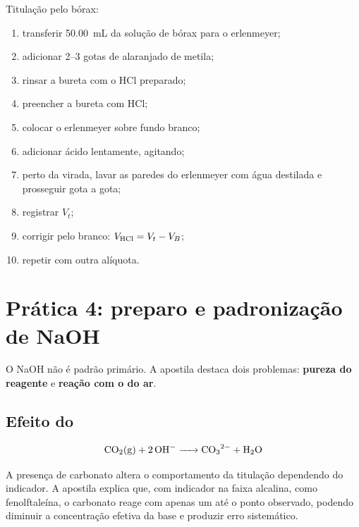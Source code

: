 \documentclass[a4paper,12pt]{article}
\begin{document}
\begin{procedimento}
Titulação pelo bórax:
\begin{enumerate}[leftmargin=1.7em]
    \item transferir \SI{50.00}{\milli\liter} da solução de bórax para o erlenmeyer;
    \item adicionar 2--3 gotas de alaranjado de metila;
    \item rinsar a bureta com o HCl preparado;
    \item preencher a bureta com HCl;
    \item colocar o erlenmeyer sobre fundo branco;
    \item adicionar ácido lentamente, agitando;
    \item perto da virada, lavar as paredes do erlenmeyer com água destilada e prosseguir gota a gota;
    \item registrar $V_t$;
    \item corrigir pelo branco: $V_{\ce{HCl}}=V_t-V_B$;
    \item repetir com outra alíquota.
\end{enumerate}
\end{procedimento}

\section{Prática 4: preparo e padronização de NaOH}

O NaOH não é padrão primário. A apostila destaca dois problemas: \textbf{pureza do reagente} e \textbf{reação com o  do ar}.

\subsection{Efeito do \texorpdfstring{}{CO2}}

\[
\ce{CO2(g) + 2OH^- -> CO3^{2-} + H2O}
\]

A presença de carbonato altera o comportamento da titulação dependendo do indicador. A apostila explica que, com indicador na faixa alcalina, como fenolftaleína, o carbonato reage com apenas um  até o ponto observado, podendo diminuir a concentração efetiva da base e produzir erro sistemático.
\end{document}

